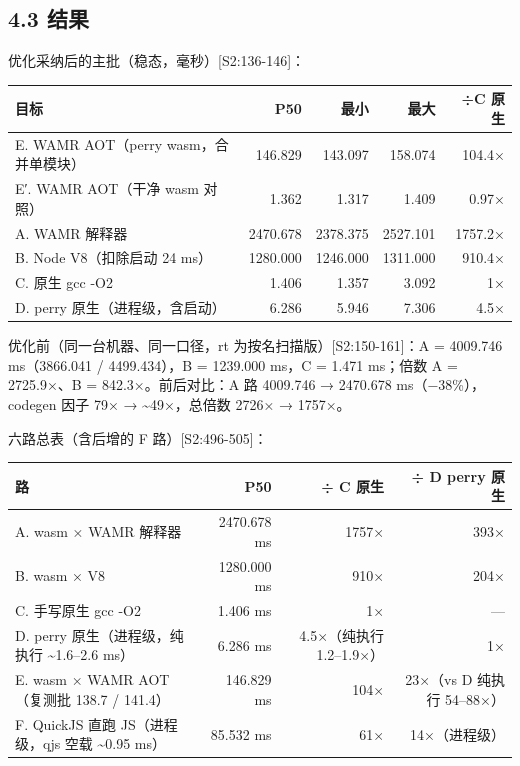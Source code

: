 \documentclass[11pt, a4paper]{article}
\begin{document}
\subsection{4.3 结果}

优化采纳后的主批（稳态，毫秒）[S2:136-146]：


\begin{center}\small\begin{tabular}{lrrrr}
\toprule
目标 & P50 & 最小 & 最大 & ÷C 原生 \\
\midrule
E. WAMR AOT（perry wasm，合并单模块） & 146.829 & 143.097 & 158.074 & 104.4× \\
E′. WAMR AOT（干净 wasm 对照） & 1.362 & 1.317 & 1.409 & 0.97× \\
A. WAMR 解释器 & 2470.678 & 2378.375 & 2527.101 & 1757.2× \\
B. Node V8（扣除启动 24 ms） & 1280.000 & 1246.000 & 1311.000 & 910.4× \\
C. 原生 gcc -O2 & 1.406 & 1.357 & 3.092 & 1× \\
D. perry 原生（进程级，含启动） & 6.286 & 5.946 & 7.306 & 4.5× \\
\bottomrule
\end{tabular}\end{center}


优化前（同一台机器、同一口径，rt 为按名扫描版）[S2:150-161]：A = 4009.746 ms（3866.041 / 4499.434），B = 1239.000 ms，C = 1.471 ms；倍数 A = 2725.9×、B = 842.3×。前后对比：A 路 4009.746 → 2470.678 ms（−38\%），codegen 因子 79× → \textasciitilde{}49×，总倍数 2726× → 1757×。


六路总表（含后增的 F 路）[S2:496-505]：


\begin{center}\small\begin{tabular}{lrrr}
\toprule
路 & P50 & ÷ C 原生 & ÷ D perry 原生 \\
\midrule
A. wasm × WAMR 解释器 & 2470.678 ms & 1757× & 393× \\
B. wasm × V8 & 1280.000 ms & 910× & 204× \\
C. 手写原生 gcc -O2 & 1.406 ms & 1× & — \\
D. perry 原生（进程级，纯执行 \textasciitilde{}1.6–2.6 ms） & 6.286 ms & 4.5×（纯执行 1.2–1.9×） & 1× \\
E. wasm × WAMR AOT（复测批 138.7 / 141.4） & 146.829 ms & 104× & 23×（vs D 纯执行 54–88×） \\
F. QuickJS 直跑 JS（进程级，qjs 空载 \textasciitilde{}0.95 ms） & 85.532 ms & 61× & 14×（进程级） \\
\bottomrule
\end{tabular}\end{center}
\end{document}
